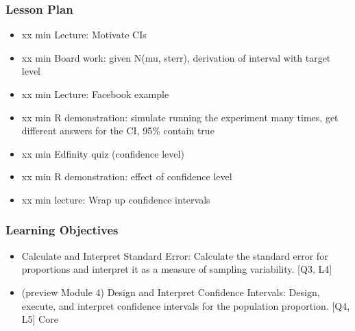 

\begin{frame}
\frametitle{Lesson Plan}
\begin{itemize}
    \item xx min Lecture: Motivate CIs
    \item xx min Board work: given N(mu, sterr), derivation of interval with target level
    \item xx min Lecture: Facebook example
    \item xx min R demonstration: simulate running the experiment many times, get different answers for the CI, 95\% contain true
    \item xx min Edfinity quiz (confidence level)
    \item xx min R demonstration: effect of confidence level
    \item xx min lecture: Wrap up confidence intervals
\end{itemize}
\end{frame}
        
\begin{frame}
\frametitle{Learning Objectives}
\begin{itemize}
    \item Calculate and Interpret Standard Error: Calculate the standard error for proportions and interpret it as a measure of sampling variability. [Q3, L4]
    \item (preview Module 4) Design and Interpret Confidence Intervals: Design, execute, and interpret confidence intervals for the population proportion. [Q4, L5] Core 
\end{itemize}
\end{frame}


